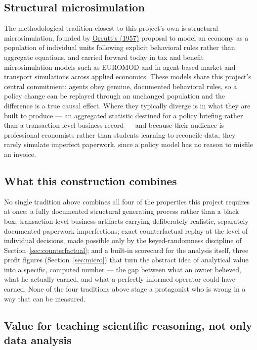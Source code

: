 \documentclass[12pt,a4paper]{article}
\begin{document}
\subsection{Structural microsimulation}

The methodological tradition closest to this project's own is structural
microsimulation, founded by \hyperlink{ref:orcutt1957}{Orcutt's (1957)}
proposal to model an economy as a population of individual units
following explicit behavioral rules rather than aggregate equations, and
carried forward today in tax and benefit microsimulation models such as
EUROMOD and in agent-based market and transport simulations across
applied economics. These models share this project's central
commitment: agents obey genuine, documented behavioral rules, so a
policy change can be replayed through an unchanged population and the
difference is a true causal effect. Where they typically diverge is in
what they are built to produce --- an aggregated statistic destined for
a policy briefing rather than a transaction-level business record --- and
because their audience is professional economists rather than students
learning to reconcile data, they rarely simulate imperfect paperwork,
since a policy model has no reason to misfile an invoice.

\subsection{What this construction combines}

No single tradition above combines all four of the properties this
project requires at once: a fully documented structural generating
process rather than a black box; transaction-level business artifacts
carrying deliberately realistic, separately documented paperwork
imperfections; exact counterfactual replay at the level of individual
decisions, made possible only by the keyed-randomness discipline of
Section~\ref{sec:counterfactual}; and a built-in scorecard for the analysis
itself, three profit figures (Section~\ref{sec:micro}) that turn the
abstract idea of analytical value into a specific, computed number ---
the gap between what an owner believed, what he actually earned, and
what a perfectly informed operator could have earned. None of the four
traditions above stage a protagonist who is wrong in a way that can be
measured.

\subsection{Value for teaching scientific reasoning, not only data analysis}
\end{document}
